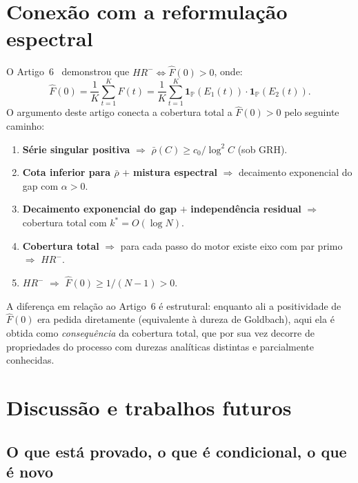 \documentclass[11pt]{article}
\theoremstyle{definition}
\begin{document}
	\section{Conexão com a reformulação espectral}
	
	O Artigo~6~\cite{art6} demonstrou que $HR^-\Leftrightarrow\widehat{F}(0)>0$, onde:
	\[
	\widehat{F}(0) = \frac{1}{K}\sum_{t=1}^{K}F(t) = \frac{1}{K}\sum_{t=1}^{K}\mathbf{1}_{\mathbb{P}}(E_1(t))\cdot\mathbf{1}_{\mathbb{P}}(E_2(t)).
	\]
	O argumento deste artigo conecta a cobertura total a $\widehat{F}(0)>0$ pelo seguinte caminho:
	
	\begin{enumerate}
		\item \textbf{Série singular positiva} $\Rightarrow$ $\bar\rho(C)\ge c_0/\log^2 C$ (sob GRH).
		\item \textbf{Cota inferior para $\bar\rho$} $+$ \textbf{mistura espectral} $\Rightarrow$ decaimento exponencial do gap com $\alpha>0$.
		\item \textbf{Decaimento exponencial do gap} $+$ \textbf{independência residual} $\Rightarrow$ cobertura total com $k^*=O(\log N)$.
		\item \textbf{Cobertura total} $\Rightarrow$ para cada passo do motor existe eixo com par primo $\Rightarrow$ $HR^-$.
		\item $HR^-$ $\Rightarrow$ $\widehat{F}(0)\ge 1/(N-1)>0$.
	\end{enumerate}
	
	A diferença em relação ao Artigo~6 é estrutural: enquanto ali a positividade de $\widehat{F}(0)$ era pedida diretamente (equivalente à dureza de Goldbach), aqui ela é obtida como \emph{consequência} da cobertura total, que por sua vez decorre de propriedades do processo com durezas analíticas distintas e parcialmente conhecidas.
	
	\section{Discussão e trabalhos futuros}
	
	\subsection{O que está provado, o que é condicional, o que é novo}
	
\end{document}
